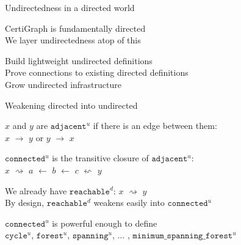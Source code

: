 \documentclass[usenames, xcolor=dvipsnames]{beamer}
\newcommand{\m}[1]{\ensuremath{\mathit{#1}}} %
\begin{document}
\begin{frame}[fragile]{Undirectedness in a directed world}

CertiGraph is fundamentally directed \\
We layer undirectedness atop of this

\pause \bigskip

\hspace{1em} Build lightweight undirected definitions \\
\hspace{1em} Prove connections to existing directed definitions \\
\hspace{1em} Grow undirected infrastructure

\end{frame}

\begin{frame}{Weakening directed into undirected}

\m{x} and \m{y} are $\texttt{adjacent}^{u}$ if there is an edge between them: \\
\hspace{1em} \m{x} $\rightarrow$ \m{y} or \m{y} $\rightarrow$ \m{x} \\

\pause \bigskip

$\texttt{connected}^{u}$ is the transitive closure of $\texttt{adjacent}^{u}$: \\
\hspace{1em} \m{x} $\rightsquigarrow$ \m{a} $\leftarrow$ \m{b} $\leftarrow$ \m{c} $\leftsquigarrow$ \m{y} \\

\pause \bigskip

We already have $\texttt{reachable}^{d}$: \hspace{0.5em} \m{x} $\rightsquigarrow$ \m{y} \\
\pause
By design, $\texttt{reachable}^{d}$ weakens easily into $\texttt{connected}^{u}$

\pause \bigskip

$\texttt{connected}^{u}$ is powerful enough to define \\
$\texttt{cycle}^{u}$, $\texttt{forest}^{u}$, $\texttt{spanning}^{u}$, $\ldots$ ,
$\texttt{minimum\_spanning\_forest}^{u}$

\end{frame}
\end{document}

